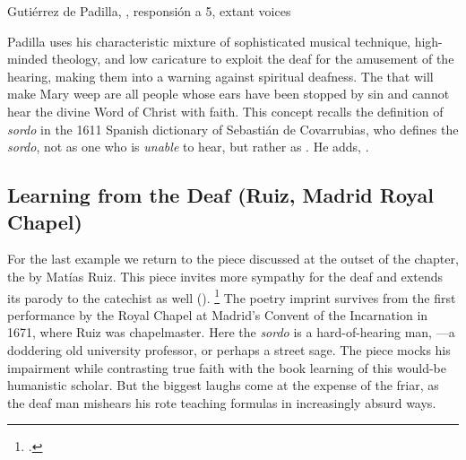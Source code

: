 \begin{musicexample}
    \caption{Gutiérrez de Padilla, ,
    responsión a 5, extant voices}

    \label{music:Padilla-Sordo-responsion}
\end{musicexample}

Padilla uses his characteristic mixture of sophisticated musical technique,
high-minded theology, and low caricature to exploit the deaf for the amusement
of the hearing, making them into a warning against spiritual deafness.
The  that will make Mary weep are all people whose ears have
been stopped by sin and cannot hear the divine Word of Christ with faith.
This concept recalls the definition of \emph{sordo} in the 1611 Spanish
dictionary of Sebastián de Covarrubias, who defines the \emph{sordo}, not as one
who is \emph{unable} to hear, but rather as .
He adds, .%
    \Autocite
    [.] 
    {Covarrubias:Tesoro}


\subsection{Learning from the Deaf (Ruiz, Madrid Royal Chapel)}

For the last example we return to the piece discussed at the outset of the
chapter, the  by Matías Ruiz.
This piece invites more sympathy for the deaf and extends its parody to the
catechist as well
().%
    \footnote{.}
The poetry imprint survives from the first performance by the Royal Chapel at
Madrid's Convent of the Incarnation in 1671, where Ruiz was chapelmaster.%
   \Autocites{1671-Madrid-Enc-Nav}{Grove:Ruiz}
Here the \emph{sordo} is a hard-of-hearing man, ---a doddering old university professor, or perhaps a street sage.
The piece mocks his impairment while contrasting true faith with the book
learning of this would-be humanistic scholar.
But the biggest laughs come at the expense of the friar, as the deaf man
mishears his rote teaching formulas in increasingly absurd ways.

